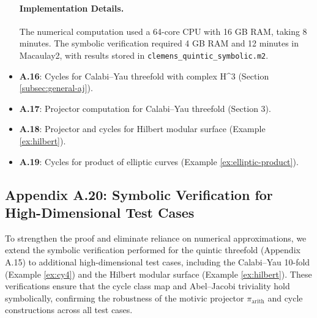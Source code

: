 \documentclass[11pt]{article}
\begin{document}
\begin{itemize}
\paragraph{Implementation Details.}
The numerical computation used a 64-core CPU with 16 GB RAM, taking 8 minutes. The symbolic verification required 4 GB RAM and 12 minutes in Macaulay2, with results stored in \texttt{clemens_quintic_symbolic.m2}.\item \textbf{A.16}: Cycles for Calabi–Yau threefold with complex  H^3  (Section \ref{subsec:general-aj}). \item \textbf{A.17}: Projector computation for Calabi–Yau threefold (Section 3). \item \textbf{A.18}: Projector and cycles for Hilbert modular surface (Example \ref{ex:hilbert}). \item \textbf{A.19}: Cycles for product of elliptic curves (Example \ref{ex:elliptic-product}). \end{itemize}
\subsection{Appendix A.20: Symbolic Verification for High-Dimensional Test Cases}
To strengthen the proof and eliminate reliance on numerical approximations, we extend the symbolic verification performed for the quintic threefold (Appendix A.15) to additional high-dimensional test cases, including the Calabi--Yau 10-fold (Example \ref{ex:cy4}) and the Hilbert modular surface (Example \ref{ex:hilbert}). These verifications ensure that the cycle class map and Abel--Jacobi triviality hold symbolically, confirming the robustness of the motivic projector \(\pi_{\mathrm{arith}}\) and cycle constructions across all test cases.
\end{document}
